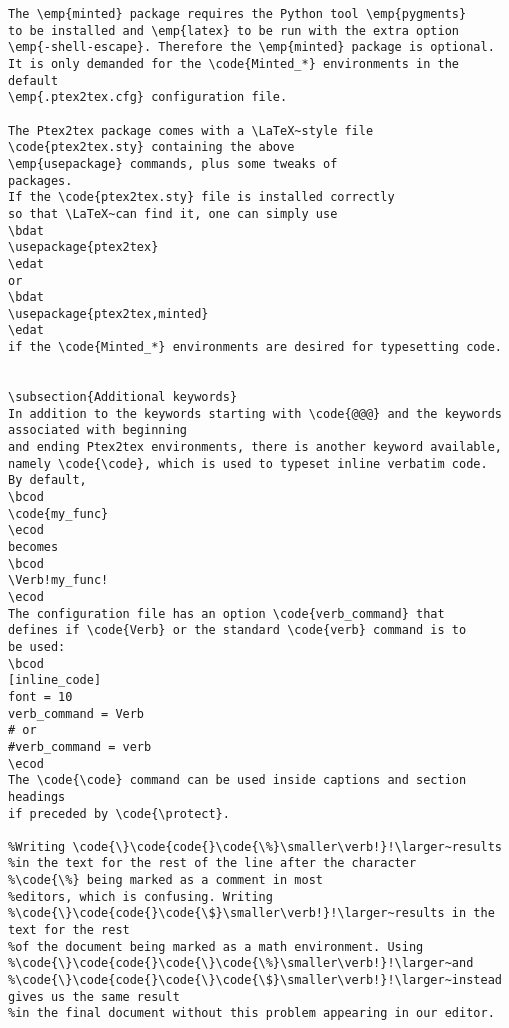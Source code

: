 \documentclass[a4paper,11pt]{article}
\begin{document}
{\begin{Verbatim}
The \emp{minted} package requires the Python tool \emp{pygments}
to be installed and \emp{latex} to be run with the extra option
\emp{-shell-escape}. Therefore the \emp{minted} package is optional.
It is only demanded for the \code{Minted_*} environments in the default
\emp{.ptex2tex.cfg} configuration file.

The Ptex2tex package comes with a \LaTeX~style file
\code{ptex2tex.sty} containing the above
\emp{usepackage} commands, plus some tweaks of
packages.
If the \code{ptex2tex.sty} file is installed correctly
so that \LaTeX~can find it, one can simply use
\bdat
\usepackage{ptex2tex}
\edat
or
\bdat
\usepackage{ptex2tex,minted}
\edat
if the \code{Minted_*} environments are desired for typesetting code.


\subsection{Additional keywords}
In addition to the keywords starting with \code{@@@} and the keywords
associated with beginning
and ending Ptex2tex environments, there is another keyword available,
namely \code{\code}, which is used to typeset inline verbatim code.
By default,
\bcod
\code{my_func}
\ecod
becomes
\bcod
\Verb!my_func!
\ecod
The configuration file has an option \code{verb_command} that
defines if \code{Verb} or the standard \code{verb} command is to
be used:
\bcod
[inline_code]
font = 10
verb_command = Verb
# or
#verb_command = verb
\ecod
The \code{\code} command can be used inside captions and section headings
if preceded by \code{\protect}.

%Writing \code{\}\code{code{}\code{\%}\smaller\verb!}!\larger~results
%in the text for the rest of the line after the character
%\code{\%} being marked as a comment in most
%editors, which is confusing. Writing
%\code{\}\code{code{}\code{\$}\smaller\verb!}!\larger~results in the text for the rest
%of the document being marked as a math environment. Using
%\code{\}\code{code{}\code{\}\code{\%}\smaller\verb!}!\larger~and
%\code{\}\code{code{}\code{\}\code{\$}\smaller\verb!}!\larger~instead gives us the same result
%in the final document without this problem appearing in our editor.


\end{Verbatim}}
\end{document}

